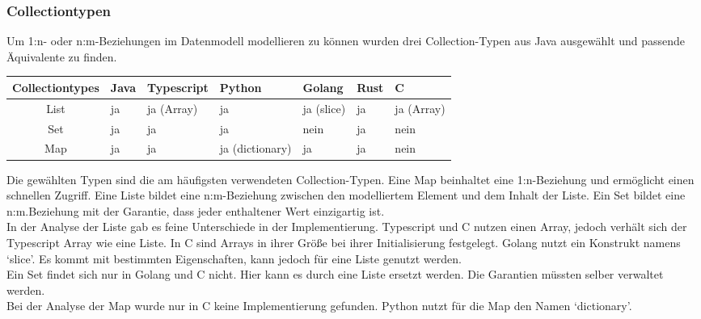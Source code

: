 \documentclass[./einleitung.tex]{subfiles}
\begin{document}
    \subsubsection{Collectiontypen}
    Um 1:n- oder n:m-Beziehungen im Datenmodell modellieren zu können wurden drei Collection-Typen aus Java ausgewählt und passende Äquivalente zu finden.
    \begin{center}
        \begin{tabular}{| c || m{3em} | m{4.5em} | m{5.5em} | m{4.5em} | m{3em} | m{4.5em} |}
            \hline
            Collectiontypes & Java & Typescript & Python          & Golang     & Rust & C          \\
            \hline
            List            & ja   & ja (Array) & ja              & ja (slice) & ja   & ja (Array) \\
            \hline
            Set             & ja   & ja         & ja              & nein       & ja   & nein       \\
            \hline
            Map             & ja   & ja         & ja (dictionary) & ja         & ja   & nein       \\
            \hline

        \end{tabular}
    \end{center}
    Die gewählten Typen sind die am häufigsten verwendeten Collection-Typen.
    Eine Map beinhaltet eine 1:n-Beziehung und ermöglicht einen schnellen Zugriff.
    Eine Liste bildet eine n:m-Beziehung zwischen den modelliertem Element und dem Inhalt der Liste.
    Ein Set bildet eine n:m.Beziehung mit der Garantie, dass jeder enthaltener Wert einzigartig ist. \\

    In der Analyse der Liste gab es feine Unterschiede in der Implementierung.
    Typescript und C nutzen einen Array, jedoch verhält sich der Typescript Array wie eine Liste.
    In C sind Arrays in ihrer Größe bei ihrer Initialisierung festgelegt.
    Golang nutzt ein Konstrukt namens `slice'.
    Es kommt mit bestimmten Eigenschaften, kann jedoch für eine Liste genutzt werden. \\

    Ein Set findet sich nur in Golang und C nicht.
    Hier kann es durch eine Liste ersetzt werden.
    Die Garantien müssten selber verwaltet werden. \\

    Bei der Analyse der Map wurde nur in C keine Implementierung gefunden.
    Python nutzt für die Map den Namen `dictionary'.
\end{document}
